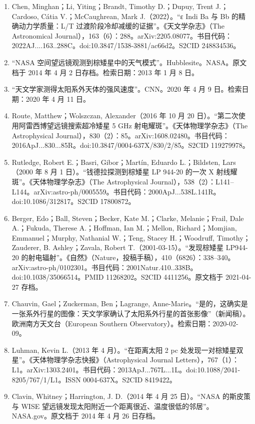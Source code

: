 \begin{enumerate}
\item Chen, Minghan；Li, Yiting；Brandt, Timothy D.；Dupuy, Trent J.；Cardoso, Cátia V.；McCaughrean, Mark J.（2022）。“ε Indi Ba 与 Bb 的精确动力学质量：L/T 过渡阶段冷却减缓的证据”。《天文学杂志》（The Astronomical Journal），163（6）：288。arXiv:2205.08077。书目代码：2022AJ....163..288C。doi:10.3847/1538-3881/ac66d2。S2CID 248834536。
\item “NASA 空间望远镜观测到棕矮星中的天气模式”。Hubblesite。NASA。原文档于 2014 年 4 月 2 日存档。检索日期：2013 年 1 月 8 日。
\item “天文学家测得太阳系外天体的强风速度”。CNN。2020 年 4 月 9 日。检索日期：2020 年 4 月 11 日。
\item Route, Matthew；Wolszczan, Alexander（2016 年 10 月 20 日）。“第二次使用阿雷西博望远镜搜索超冷矮星 5 GHz 射电耀斑”。《天体物理学杂志》（The Astrophysical Journal），830（2）：85。arXiv:1608.02480。书目代码：2016ApJ...830...85R。doi:10.3847/0004-637X/830/2/85。S2CID 119279978。
\item Rutledge, Robert E.；Basri, Gibor；Martín, Eduardo L.；Bildsten, Lars（2000 年 8 月 1 日）。“钱德拉探测到棕矮星 LP 944-20 的一次 X 射线耀斑”。《天体物理学杂志》（The Astrophysical Journal），538（2）：L141–L144。arXiv:astro-ph/0005559。书目代码：2000ApJ...538L.141R。doi:10.1086/312817。S2CID 17800872。
\item Berger, Edo；Ball, Steven；Becker, Kate M.；Clarke, Melanie；Frail, Dale A.；Fukuda, Therese A.；Hoffman, Ian M.；Mellon, Richard；Momjian, Emmanuel；Murphy, Nathanial W.；Teng, Stacey H.；Woodruff, Timothy；Zauderer, B. Ashley；Zavala, Robert T.（2001-03-15）。“发现棕矮星 LP944-20 的射电辐射”。《自然》（Nature，投稿手稿），410（6826）：338–340。arXiv:astro-ph/0102301。书目代码：2001Natur.410..338B。doi:10.1038/35066514。PMID 11268202。S2CID 4411256。原文档于 2021-04-27 存档。
\item Chauvin, Gael；Zuckerman, Ben；Lagrange, Anne-Marie。“是的，这确实是一张系外行星的图像：天文学家确认了太阳系外行星的首张影像”（新闻稿）。欧洲南方天文台（European Southern Observatory）。检索日期：2020-02-09。
\item Luhman, Kevin L.（2013 年 4 月）。“在距离太阳 2 pc 处发现一对棕矮星双星”。《天体物理学杂志快报》（Astrophysical Journal Letters），767（1）：L1。arXiv:1303.2401。书目代码：2013ApJ...767L...1L。doi:10.1088/2041-8205/767/1/L1。ISSN 0004-637X。S2CID 8419422。
\item Clavin, Whitney；Harrington, J. D.（2014 年 4 月 25 日）。“NASA 的斯皮策与 WISE 望远镜发现太阳附近一个距离很近、温度很低的邻居”。NASA.gov。原文档于 2014 年 4 月 26 日存档。

\end{enumerate}
